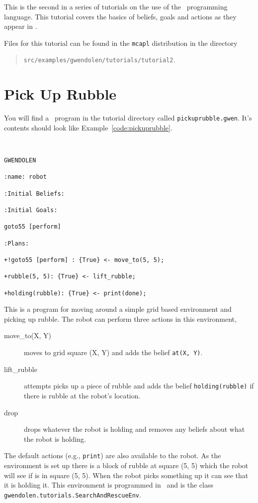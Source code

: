 
This is the second in a series of tutorials on the use of the \gwendolen\ programming language.  This tutorial covers the basics of beliefs, goals and actions as they appear in \gwendolen.

Files for this tutorial can be found in the \texttt{mcapl} distribution in the directory 
\begin{quote}
\texttt{src/examples/gwendolen/tutorials/tutorial2}.
\end{quote}

\section{Pick Up Rubble}

You will find a \gwendolen\ program in the tutorial directory called \texttt{pickuprubble.gwen}.  It's contents should look like Example~\ref{code:pickuprubble}.
\begin{ourexample}
\label{code:pickuprubble}\quad \\
\begin{lstlisting}[basicstyle=\sffamily,language=Gwendolen,style=easslisting]
GWENDOLEN

:name: robot

:Initial Beliefs:

:Initial Goals:

goto55 [perform]

:Plans:

+!goto55 [perform] : {True} <- move_to(5, 5);

+rubble(5, 5): {True} <- lift_rubble;

+holding(rubble): {True} <- print(done);
\end{lstlisting}
\end{ourexample}
This is a program for moving around a simple grid based environment and picking up rubble.  The robot can perform three actions in this environment, 
\begin{description}
\item[move\_to(X, Y)] moves to grid square (X, Y) and adds the belief \lstinline{at(X, Y)}.
\item[lift\_rubble] attempts picks up a piece of rubble and adds the belief \lstinline{holding(rubble)} if there is rubble at the robot's location.
\item[drop] drops whatever the robot is holding and removes any beliefs about what the robot is holding.
\end{description}
The default actions (e.g., \lstinline{print}) are also available to the robot.  As the environment is set up there is a block of rubble at square (5, 5) which the robot will see if is in square (5, 5).  When the robot picks something  up it can see that it is holding it.  This environment is programmed in \java\ and is the class \lstinline{gwendolen.tutorials.SearchAndRescueEnv}.

